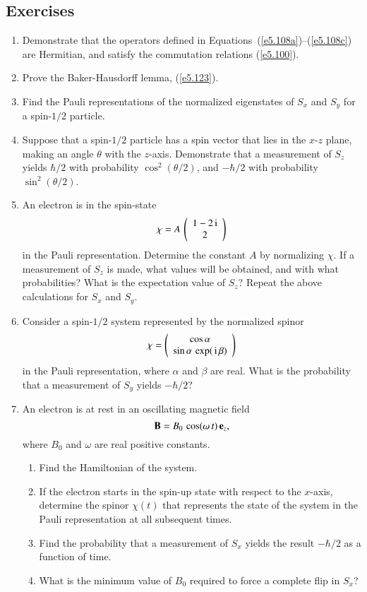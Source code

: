 \subsection*{Exercises}
\begin{enumerate}[label=\thechapter.\arabic*,leftmargin=*,widest=9.20]

\item Demonstrate that the operators defined in Equations~(\ref{e5.108a})--(\ref{e5.108c}) are Hermitian, and
satisfy
the commutation relations (\ref{e5.100}). 

\item Prove the Baker-Hausdorff lemma, (\ref{e5.123}). 

\item  Find the Pauli representations of the normalized eigenstates of $S_x$ and $S_y$ for
a spin-$1/2$ particle. 

\item Suppose that a spin-$1/2$ particle
has a spin vector that lies in the $x$-$z$ plane, making an
angle $\theta$ with the $z$-axis. Demonstrate that a measurement of $S_z$
yields $\hbar/2$ with probability $\cos^2(\theta/2)$, and $-\hbar/2$
with probability $\sin^2(\theta/2)$. 

\item An electron is in the spin-state 
$$
\chi = A\,\left(\begin{array}{c}1-2\,{\rm i}\\2\end{array}\right)
$$
in the Pauli representation. Determine the constant $A$ by normalizing
$\chi$. If a measurement of $S_z$ is made, what values will be
obtained, and with what probabilities? What is the expectation
value of $S_z$? Repeat the above calculations for $S_x$ and $S_y$. 

\item Consider a spin-$1/2$ system represented by the normalized spinor
$$
\chi =\left(\begin{array}{c}\cos\alpha\\\sin\alpha\,\exp(\,{\rm i}\,\beta)\end{array}\right)
$$
in the Pauli representation, where $\alpha$ and $\beta$ are real. What is the probability that a measurement of
$S_y$ yields $-\hbar/2$? 

\item An electron is at rest in an oscillating magnetic field
$$
{\bf B} = B_0\,\cos(\omega\,t)\,{\bf e}_z,
$$
where $B_0$ and $\omega$ are real positive constants. 
\begin{enumerate}
\item Find the Hamiltonian of the system.
\item If the electron starts in the spin-up state with respect to the
$x$-axis, determine the spinor $\chi(t)$ that represents the state
of the system in the Pauli representation at all subsequent times.
\item Find the probability that a measurement of $S_x$ yields
the result $-\hbar/2$ as a function of time.
\item What is the minimum value of $B_0$ required to force a
complete flip in $S_x$?
\end{enumerate}
\end{enumerate}